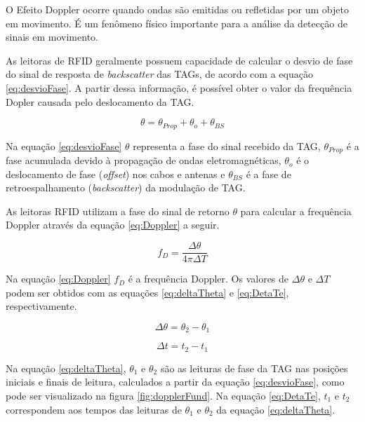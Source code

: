 O Efeito Doppler ocorre quando ondas são emitidas ou refletidas por um objeto em movimento. É um fenômeno físico importante para a análise da detecção de sinais em movimento.

As leitoras de RFID geralmente possuem capacidade de calcular o desvio de fase do sinal de resposta de \textit{backscatter} das TAGs, de acordo com a equação \ref{eq:desvioFase}. A partir dessa informação, é possível obter o valor da frequência Dopler causada pelo deslocamento da TAG. \cite{nikitin2010phase} \cite{tesch2015rfid}

\begin{equation}
    \theta = \theta_{Prop} + \theta_{o} + \theta_{BS}
    \label{eq:desvioFase}
\end{equation}

Na equação \ref{eq:desvioFase} $\theta$ representa a fase do sinal recebido da TAG, $\theta_{Prop}$ é a fase acumulada devido à propagação de ondas eletromagnéticas, $\theta_{o}$ é o deslocamento de fase (\textit{offset}) nos cabos e antenas e $\theta_{BS}$ é a fase de retroespalhamento (\textit{backscatter}) da modulação de TAG. \cite{nikitin2010phase} \cite{tesch2015rfid}

As leitoras RFID utilizam a fase do sinal de retorno $\theta$ para calcular a frequência Doppler através da equação \ref{eq:Doppler} a seguir.\cite{tesch2015rfid}

\begin{equation}
    f_D = \frac{\Delta \theta}{4 \pi \Delta T}
    \label{eq:Doppler}
\end{equation}

Na equação \ref{eq:Doppler} $f_D$ é a frequência Doppler. Os valores de $\Delta \theta$ e $\Delta T$ podem ser obtidos com as equações \ref{eq:deltaTheta} e \ref{eq:DetaTe}, respectivamente.\cite{tesch2015rfid}

\begin{equation}
    \Delta \theta = \theta_2 - \theta_1
    \label{eq:deltaTheta}
\end{equation}

\begin{equation}
    \Delta t = t_2 - t_1
    \label{eq:DetaTe}
\end{equation}

Na equação \ref{eq:deltaTheta}, $\theta_1$ e $\theta_2$ são as leituras de fase da TAG nas posições iniciais e finais de leitura, calculados a partir da equação \ref{eq:desvioFase}, como pode ser visualizado na figura \ref{fig:dopplerFund}. Na equação \ref{eq:DetaTe}, $t_1$ e $t_2$ correspondem aos tempos das leituras de $\theta_1$ e $\theta_2$ da equação \ref{eq:deltaTheta}. \cite{tesch2015rfid}

